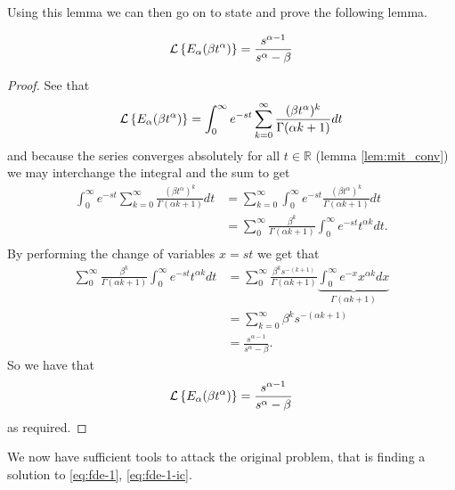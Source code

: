 Using this lemma we can then go on to state and prove the following lemma.

\begin{lemma}
\label{lem:lap_mit}
	\begin{align*}	
		\mathcal{L} \left\{  E_\alpha (\beta t^\alpha) \right\} = \frac{s^{\alpha - 1}}{s^\alpha - \beta}
	\end{align*}
\end{lemma}
\begin{proof}
	See that
	\begin{align*}
		\mathcal{L} \left\{  E_\alpha (\beta t^\alpha) \right\} = \int_0^\infty e^{-st} \sum_{k=0}^\infty \frac{(\beta t^\alpha)^k}{\Gamma(\alpha k+1)} dt
	\end{align*}
	and because the series converges absolutely for all $ t \in \mathbb{R} $ (lemma \ref{lem:mit_conv}) we may interchange the integral
	and the sum to get
	\begin{align*}
		\int_0^\infty e^{-st} \sum_{k=0}^\infty \frac{(\beta t^\alpha)^k}{\Gamma(\alpha k+1)} dt &= \sum_{k=0}^\infty \int_0^\infty e^{-st} \frac{(\beta t^\alpha)^k}{\Gamma(\alpha k + 1)} dt \\
			&= \sum_0^\infty \frac{\beta^k}{\Gamma(\alpha k + 1)} \int_0^\infty e^{-st} t^{\alpha k} dt. \\
	\end{align*}
	By performing the change of variables $ x =st $ we get that 
	\begin{align*}
		\sum_0^\infty \frac{\beta^k}{\Gamma(\alpha k + 1)} \int_0^\infty e^{-st} t^{\alpha k} dt 
			&= \sum_0^\infty \frac{\beta^k s^{-(k+1)}}{\Gamma(\alpha k + 1)} \underbrace{\int_0^\infty e^{-x} x^{\alpha k} dx}_{\Gamma(\alpha k + 1)} \\
			&= \sum_{k=0}^\infty \beta^{k} s^{-(\alpha k + 1)} \\
			&= \frac{s^{\alpha-1}}{s^\alpha - \beta}.		
	\end{align*}
	So we have that 
	\begin{align*}	
		\mathcal{L} \left\{  E_\alpha (\beta t^\alpha) \right\} = \frac{s^{\alpha - 1}}{s^\alpha - \beta}
	\end{align*}	
	as required.
\end{proof}

We now have sufficient tools to attack the original problem, that is finding a solution to \eqref{eq:fde-1}, \eqref{eq:fde-1-ic}.

